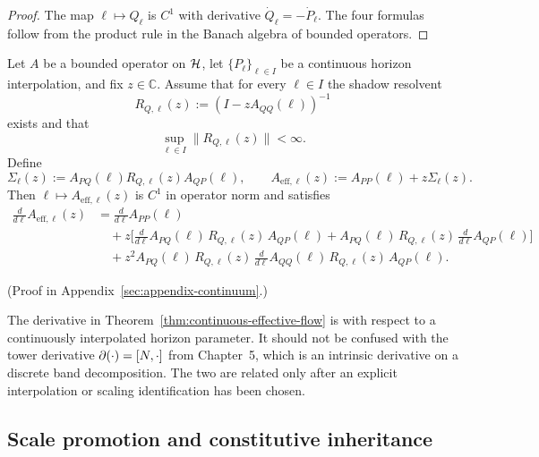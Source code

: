 \begin{proof}
The map $\ell\mapsto Q_\ell$ is $C^1$ with derivative
$\dot Q_\ell=-\dot P_\ell$. The four formulas follow from the product rule in
the Banach algebra of bounded operators.
\end{proof}

\begin{theorem}
\label{thm:continuous-effective-flow}
Let $A$ be a bounded operator on $\mathcal{H}$, let $\{P_\ell\}_{\ell\in I}$ be a
continuous horizon interpolation, and fix $z\in\mathbb{C}$. Assume that for
every $\ell\in I$ the shadow resolvent
\[
R_{Q,\ell}(z):=(I-zA_{QQ}(\ell))^{-1}
\]
exists and that
\[
\sup_{\ell\in I}\|R_{Q,\ell}(z)\|<\infty.
\]
Define
\[
\Sigma_\ell(z):=A_{PQ}(\ell)R_{Q,\ell}(z)A_{QP}(\ell),
\qquad
A_{\mathrm{eff},\ell}(z):=A_{PP}(\ell)+z\Sigma_\ell(z).
\]
Then $\ell\mapsto A_{\mathrm{eff},\ell}(z)$ is $C^1$ in operator norm and
satisfies
\begin{align*}
\frac{d}{d\ell}A_{\mathrm{eff},\ell}(z)
&=
\frac{d}{d\ell}A_{PP}(\ell) \\
&\quad
+ z\Big[
\frac{d}{d\ell}A_{PQ}(\ell)\,R_{Q,\ell}(z)\,A_{QP}(\ell)
+
A_{PQ}(\ell)\,R_{Q,\ell}(z)\,\frac{d}{d\ell}A_{QP}(\ell)
\Big] \\
&\quad
+ z^2 A_{PQ}(\ell)\,R_{Q,\ell}(z)\,
\frac{d}{d\ell}A_{QQ}(\ell)\,
R_{Q,\ell}(z)\,A_{QP}(\ell).
\end{align*}
\end{theorem}

(Proof in Appendix~\ref{sec:appendix-continuum}.)

\begin{remark}
\label{rem:continuous-flow-vs-tower-derivative}
The derivative in Theorem~\ref{thm:continuous-effective-flow} is with respect
to a continuously interpolated horizon parameter. It should not be confused
with the tower derivative $\partial(\cdot)=[N,\cdot]$ from Chapter~5,
which is an intrinsic derivative on a discrete band decomposition. The two are
related only after an explicit interpolation or scaling identification has been
chosen.
\end{remark}

\subsection{Scale promotion and constitutive inheritance}

